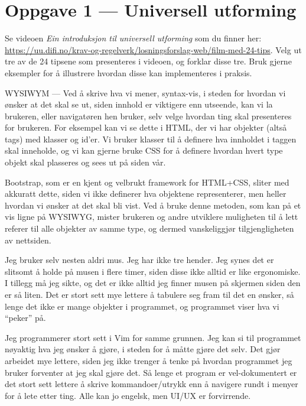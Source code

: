 \documentclass{../../myassignment}
\begin{document}
\section*{Oppgave 1 --- Universell utforming}
	\begin{problem}
		Se videoen \textit{Ein introduksjon til universell utforming} som du finner her: \url{https://uu.difi.no/krav-og-regelverk/losningsforslag-web/film-med-24-tips}. Velg ut tre av de 24 tipsene som presenteres i videoen, og forklar disse tre. Bruk gjerne eksempler for å illustrere hvordan disse kan implementeres i praksis.
	\end{problem}
	\begin{answer}
		\begin{description}[style=nextline]
			\item [Bruk riktig kode og strukturer teksten]
				WYSIWYM --- Ved å skrive hva vi mener, syntax-vis, i steden for hvordan vi ønsker at det skal se ut, siden innhold er viktigere enn utseende, kan vi la brukeren, eller navigatøren hen bruker, selv velge hvordan ting skal presenteres for brukeren. For eksempel kan vi se dette i HTML, der vi har objekter (altså tags) med klasser og id'er. Vi bruker klasser til å definere hva innholdet i taggen skal inneholde, og vi kan gjerne bruke CSS for å definere hvordan hvert type objekt skal plasseres og sees ut på siden vår.

				Bootstrap, som er en kjent og velbrukt framework for HTML+CSS, sliter med akkuratt dette, siden vi ikke definerer hva objektene representerer, men heller hvordan vi ønsker at det skal bli vist. Ved å bruke denne metoden, som kan på et vis ligne på WYSIWYG, mister brukeren og andre utviklere muligheten til å lett referer til alle objekter av samme type, og dermed vanskeliggjør tilgjengligheten av nettsiden.

			\item [La alt innhold nås med tastatur]
				Jeg bruker selv nesten aldri mus. Jeg har ikke tre hender. Jeg synes det er slitsomt å holde på musen i flere timer, siden disse ikke alltid er like ergonomiske. I tillegg må jeg sikte, og det er ikke alltid jeg finner musen på skjermen siden den er så liten. Det er stort sett mye lettere å tabulere seg fram til det en ønsker, så lenge det ikke er mange objekter i programmet, og programmet viser hva vi ``peker'' på. 

				Jeg programmerer stort sett i Vim for samme grunnen. Jeg kan si til programmet nøyaktig hva jeg ønsker å gjøre, i steden for å måtte gjøre det selv. Det gjør arbeidet mye lettere, siden jeg ikke trenger å tenke på hvordan programmet jeg bruker forventer at jeg skal gjøre det. Så lenge et program er vel-dokumentert er det stort sett lettere å skrive kommandoer/utrykk enn å navigere rundt i menyer for å lete etter ting. Alle kan jo engelsk, men UI/UX er forvirrende.


\end{description}
\end{answer}
\end{document}

